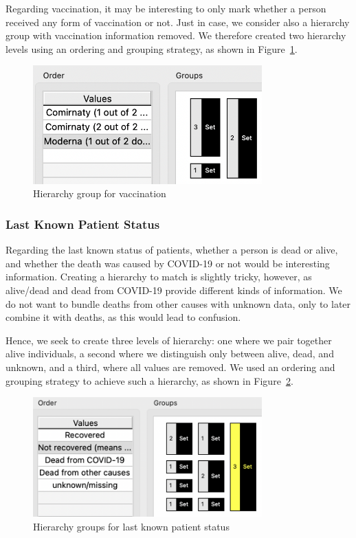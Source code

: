 \documentclass[parskip=half]{scrartcl}
\newcommand\figref{Figure~\ref}
\begin{document}
Regarding vaccination, it may be interesting to only mark whether a person
received any form of vaccination or not. Just in case, we consider also a
hierarchy group with vaccination information removed. We therefore created two
hierarchy levels using an ordering and grouping strategy, as shown in
\figref{fig:vaccination-groups}.

\begin{figure}[ht]
    \begin{center}
        \includegraphics[width=250pt]{vaccination_groups}
        \caption{Hierarchy group for vaccination}
        \label{fig:vaccination-groups}
    \end{center}
\end{figure}

\subsubsection{Last Known Patient Status}

Regarding the last known status of patients, whether a person is dead or alive,
and whether the death was caused by COVID-19 or not would be interesting
information. Creating a hierarchy to match is slightly tricky, however, as
alive/dead and dead from COVID-19 provide different kinds of information. We do
not want to bundle deaths from other causes with unknown data, only to later
combine it with deaths, as this would lead to confusion.

Hence, we seek to create three levels of hierarchy: one where we pair together
alive individuals, a second where we distinguish only between alive, dead, and
unknown, and a third, where all values are removed. We used an ordering and
grouping strategy to achieve such a hierarchy, as shown in
\figref{fig:status-groups}.

\begin{figure}[ht]
    \begin{center}
        \includegraphics[width=250pt]{status_groups}
        \caption{Hierarchy groups for last known patient status}
        \label{fig:status-groups}
    \end{center}
\end{figure}
\end{document}
